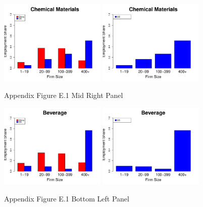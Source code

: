 \documentclass[twoside,12pt,leqno]{article}
\begin{document}
\begin{figure}[h]
    \begin{center}
    \includegraphics[width=0.45\textwidth]{./Figures/FigureE1_MidRight.pdf}
    \includegraphics[width=0.45\textwidth]{./Figures/FigureE1_US_MidRight.pdf}
    \caption{Appendix Figure E.1 Mid Right Panel}
    \end{center}
\end{figure}

\begin{figure}[h]
    \begin{center}
    \includegraphics[width=0.45\textwidth]{./Figures/FigureE1_BotLeft.pdf}
    \includegraphics[width=0.45\textwidth]{./Figures/FigureE1_US_BotLeft.pdf}
    \caption{Appendix Figure E.1 Bottom Left Panel}
    \label{fig:fige1br}
    \end{center}
\end{figure}
\end{document}

